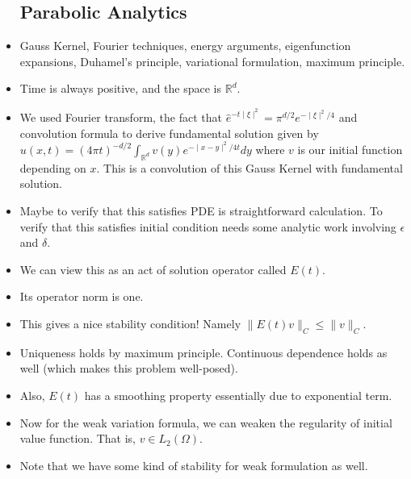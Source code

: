 \documentclass{article}
\theoremstyle{remark}
\begin{document}
\begin{itemize}
\subsection*{Parabolic Analytics}
\item Gauss Kernel, Fourier techniques, energy arguments, eigenfunction expansions, Duhamel's principle, variational formulation, maximum principle.
\item Time is always positive, and the space is $\mathbb{R}^d$.
\item We used Fourier transform, the fact that $\hat e^{-t\mid \xi\mid^2}=\pi^{d/2}e^{-\mid\xi\mid^2/4}$ and convolution formula to derive fundamental solution given by $u(x,t)=(4\pi t)^{-d/2}\int_{\mathbb{R}^d}v(y)e^{-\mid x-y\mid^2/4t}dy$ where $v$ is our initial function depending on $x$.
This is a convolution of this Gauss Kernel with fundamental solution.
\item Maybe to verify that this satisfies PDE is straightforward calculation. To verify that this satisfies initial condition needs some analytic work involving $\epsilon$ and $\delta$.
\item We can view this as an act of solution operator called $E(t)$.
\item Its operator norm is one.
\item This gives a nice stability condition! Namely $\lVert E(t)v\rVert_C\leq \lVert v\rVert_C$.
\item Uniqueness holds by maximum principle. Continuous dependence holds as well (which makes this problem well-posed).
\item Also, $E(t)$ has a smoothing property essentially due to exponential term.
\item Now for the weak variation formula, we can weaken the regularity of initial value function. That is, $v\in L_2(\Omega)$.
\item Note that we have some kind of stability for weak formulation as well.









\end{itemize}
\end{document}

